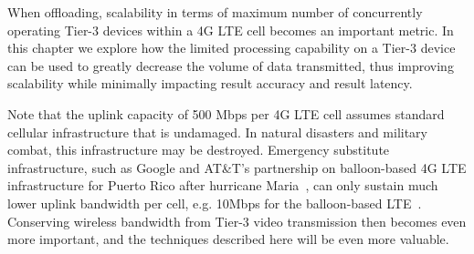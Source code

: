 When offloading, scalability in terms of maximum number of concurrently
operating Tier-3 devices within a 4G LTE cell becomes an important metric.  In
this chapter we explore how the limited processing capability on a Tier-3 device
can be used to greatly decrease the volume of data transmitted, thus improving
scalability while minimally impacting result accuracy and result latency.

Note that the uplink capacity of 500 Mbps per 4G LTE cell assumes standard
cellular infrastructure that is undamaged.  In natural disasters and military
combat, this infrastructure may be destroyed. Emergency substitute
infrastructure, such as Google and AT\&T's partnership on balloon-based 4G LTE
infrastructure for Puerto Rico after hurricane Maria~\cite{Morse2017}, can only
sustain much lower uplink bandwidth per cell, e.g. 10Mbps for the balloon-based
LTE~\cite{Sankaran2018}.  Conserving wireless bandwidth from Tier-3 video
transmission then becomes even more important, and the techniques described here
will be even more valuable.

